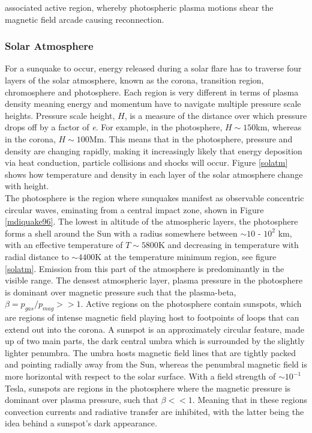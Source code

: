 associated active region, whereby photospheric plasma motions shear the magnetic field arcade causing reconnection. 


\subsubsection{Solar Atmosphere}
For a sunquake to occur, energy released during a solar flare has to traverse four layers of the solar atmosphere, known as the corona, transition region, chromosphere and photosphere. Each region is very different in terms of plasma density meaning energy and momentum have to navigate multiple pressure scale heights. Pressure scale height, $H$, is a measure of the distance over which pressure drops off by a factor of \emph{e}. For example, in the photosphere, $H\sim150$km, whereas in the corona, $H\sim100$Mm. This means that in the photosphere, pressure and density are changing rapidly, making it increasingly likely that energy deposition via heat conduction, particle collisions and shocks will occur. Figure \ref{solatm} shows how temperature and density in each layer of the solar atmosphere change with height. \\

The photosphere is the region where sunquakes manifest as observable concentric circular waves, eminating from a central impact zone, shown in Figure \ref{mdiquake96}. The lowest in altitude of the atmospheric layers, the photosphere forms a shell around the Sun with a radius somewhere between $\sim10$ - $10^{2}$ km, with an effective temperature of $T\sim5800$K and decreasing in temperature with radial distance to $\sim4400$K at the temperature minimum region, see figure \ref{solatm}. Emission from this part of the atmosphere is predominantly in the visible range. The densest atmospheric layer, plasma pressure in the photosphere is dominant over magnetic pressure such that the plasma-beta, $\beta = p_{gas}/p_{mag} >> 1$. Active regions on the photosphere contain sunspots, which are regions of intense magnetic field playing host to footpoints of loops that can extend out into the corona. A sunspot is an approximately circular feature, made up of two main parts, the dark central umbra which is surrounded by the slightly lighter penumbra. The umbra hosts magnetic field lines that are tightly packed and pointing radially away from the Sun, whereas the penumbral magnetic field is more horizontal with respect to the solar surface. With a field strength of $\sim 10^{-1}$ Tesla, sunspots are regions in the photosphere where the magnetic pressure is dominant over plasma pressure, such that $\beta << 1$. Meaning that in these regions convection currents and radiative transfer are inhibited, with the latter being the idea behind a sunspot's dark appearance. \\



